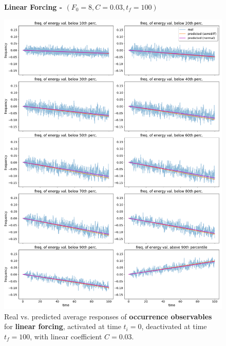 \documentclass{article}
\begin{document}
\begin{figure}[!h]
	\centering
	\textbf{Linear Forcing - $(F_0=8, C=0.03, t_f=100)$}\par\medskip
	\includegraphics[width=0.9\linewidth]{fig/pred_below_L_003_100.png}
	\caption{Real vs. predicted average responses of \textbf{occurrence observables} for \textbf{linear forcing}, activated at time $t_i=0$, deactivated at time $t_f=100$, with linear coefficient $C=0.03$.}
	\label{fig:pred_bin_L_003_100}
\end{figure}
\end{document}
